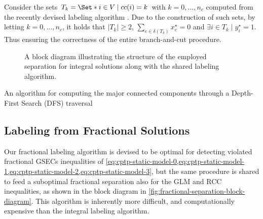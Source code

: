 Consider the sets $T_k = \Set*{i \in V \mid cc(i) = k}$ with $k = 0, \dots, n_c$
computed from the recently devised labeling algorithm .
Due to the construction of such sets,
by letting $k = 0, \dots, n_c$,
it holds that
$|T_k| \ge 2$, $\sum_{e \in \delta(T_k)} x^\star_e = 0$ and $\exists i \in T_k \mid y^\star_i = 1$.
Thus ensuring the correctness of the entire branch-and-cut procedure.

\begin{figure}[ht]
	\centering
	\caption{
		A block diagram illustrating the structure
		of the employed separation for integral solutions along with the shared labeling algorithm.
	}
	\label{fig:integral-separation-block-diagram}
\end{figure}

\begin{algorithm}
	\caption{An algorithm for computing the major connected components through a Depth-First Search (DFS) traversal}
	
	\label{algo:cc-dfs}
\end{algorithm}

\subsection{Labeling from Fractional Solutions}
\label{sec:impl-labeling-fractional-solutions}

Our fractional labeling algorithm is devised to be optimal for
detecting violated fractional GSECs inequalities
of \cref{eq:cptp-static-model-0,eq:cptp-static-model-1,eq:cptp-static-model-2,eq:cptp-static-model-3},
but the same procedure is shared
to feed a suboptimal fractional separation also for the GLM and RCC inequalities,
as shown in the block diagram in \cref{fig:fractional-separation-block-diagram}.
This algorithm is inherently more difficult, and computationally expensive
than the integral labeling algorithm.

